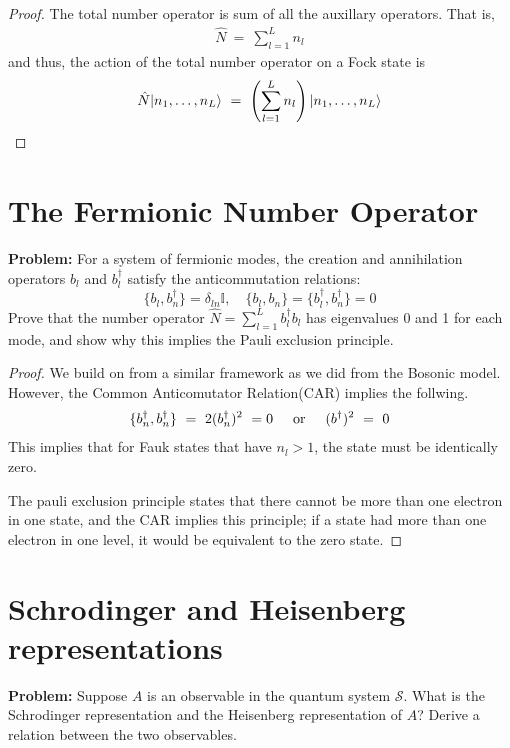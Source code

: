 \documentclass{article}
\numberwithin{equation}{section}
\DeclarePairedDelimiter\ket{\lvert}{\rangle}
\newcommand{\textOr}{
    {
        \hspace{5mm}
        \textrm{or}
        \hspace{5mm}
    }
}
\begin{document}
\begin{proof}
    The total number operator is sum of all the auxillary operators. 
    That is, 
    \begin{align}
        \hat N  \ = \ 
        \sum_{l = 1}^{L} n_l
    \end{align}
    and thus, the action of the total number operator on a Fock state is 
    \begin{align}
        \hat N \ket{n_1, \dots, n_L} \ = \ 
        \left(\sum_{l = 1}^L n_l\right) \ket{n_1, \dots, n_L}
    \end{align}
    
    
\end{proof}

\section{The Fermionic Number Operator}

\textbf{Problem:}  
For a system of fermionic modes, the creation and annihilation operators \( b_l \) and \( b_l^\dagger \) satisfy the anticommutation relations:
\[
\{b_l, b_n^\dagger\} = \delta_{ln} \mathbb{I}, \quad \{b_l, b_n\} = \{b_l^\dagger, b_n^\dagger\} = 0
\]
Prove that the number operator \( \hat{N} = \sum_{l=1}^L b_l^\dagger b_l \) has eigenvalues 0 and 1 for each mode, and show why this implies the Pauli exclusion principle.

\begin{proof}
    We build on from a similar framework as we did from the Bosonic model. 
    However, the Common Anticomutator Relation(CAR) implies the follwing. 
    \begin{align}
        \{b^\dag_n, b^\dag_n\} \ = \ 2(b^\dag_n)^2 \ = 0 
        \textOr 
        (b^\dag)^2 \ = \  0
    \end{align}
    This implies that for Fauk states that have $n_l > 1$, the 
    state must be identically zero. 

    The pauli exclusion principle states that there cannot be more 
    than one electron in one state, and the CAR implies this principle; 
    if a state had more than one electron in one level, it would be 
    equivalent to the zero state. 
\end{proof}

\section{Schrodinger and Heisenberg representations}
\textbf{Problem:}
Suppose $A$ is an observable
in the quantum system $\mathcal S$. What is the Schrodinger representation 
and the Heisenberg representation of $A$? Derive a relation between the 
two observables. 
\end{document}
